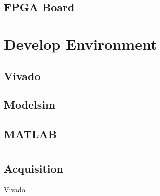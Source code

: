 \subsection{FPGA Board}

\section{Develop Environment}
\subsection{Vivado}
\subsection{Modelsim}
\subsection{MATLAB}

\section{}



\subsection{Acquisition}

Vivado


